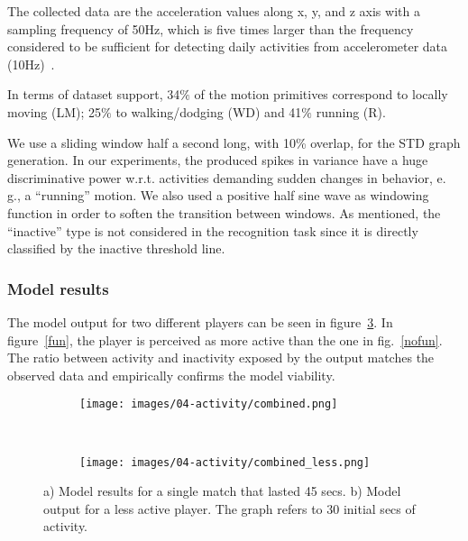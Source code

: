 The collected data are the acceleration values along x, y, and z axis with a sampling frequency of 50Hz, which is five times larger than the frequency considered to be sufficient for detecting daily activities from accelerometer data (10Hz)~\cite{kikhia_analyzing_2014}. %

In terms of dataset support, 34$\%$ of the motion primitives correspond to locally moving (LM); 25$\%$ to walking/dodging (WD) and 41$\%$ running (R). %

We use a sliding window half a second long, with 10\% overlap, for the STD graph generation. In our experiments, the produced spikes in variance have a huge discriminative power w.r.t. activities demanding sudden changes in behavior, e. g., a ``running'' motion. We also used a positive half sine wave as windowing function in order to soften the transition between windows. As mentioned, the ``inactive'' type is not considered in the recognition task since it is directly classified by the inactive threshold line. 

\subsubsection{Model results}
The model output for two different players can be seen in figure~\ref{fig:modelOutput}. In figure~\ref{fun}, the player is perceived as more active than the one in fig.~\ref{nofun}. The ratio between activity and inactivity exposed by the output matches the observed data and empirically confirms the model viability.

\begin{figure}[h!]
    \centering 
	\begin{subfigure}[H]{0.3\textwidth}
		\centering      
		\texttt{[image: images/04-activity/combined.png]}
		\caption{}
		\label{fig:fun}
	\end{subfigure}
	~
	\begin{subfigure}[H]{0.3\textwidth}
		\centering      
      	\texttt{[image: images/04-activity/combined\_less.png]}
      	\caption{}
      	\label{fig:nofun}
     \end{subfigure}
      \caption{a) Model results for a single match that lasted 45 secs. b) Model output for a less active player. The graph refers to 30 initial secs of activity.}		
      \label{fig:modelOutput}
\end{figure}

